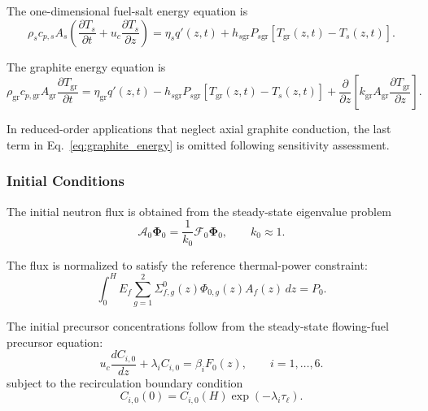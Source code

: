 \documentclass[a4paper,12pt]{article}
\begin{document}
The one-dimensional fuel-salt energy equation is
\begin{equation}
\rho_s c_{p,s}A_s
\left(
\frac{\partial T_s}{\partial t}
+
u_c\frac{\partial T_s}{\partial z}
\right)
=
\eta_s q'(z,t)
+
h_{s\mathrm{gr}}P_{s\mathrm{gr}}
\left[
T_{\mathrm{gr}}(z,t)-T_s(z,t)
\right].
\label{eq:salt_energy}
\end{equation}

The graphite energy equation is
\begin{equation}
\rho_{\mathrm{gr}} c_{p,\mathrm{gr}}A_{\mathrm{gr}}
\frac{\partial T_{\mathrm{gr}}}{\partial t}
=
\eta_{\mathrm{gr}}q'(z,t)
-
h_{s\mathrm{gr}}P_{s\mathrm{gr}}
\left[
T_{\mathrm{gr}}(z,t)-T_s(z,t)
\right]
+
\frac{\partial}{\partial z}
\left[
k_{\mathrm{gr}}A_{\mathrm{gr}}
\frac{\partial T_{\mathrm{gr}}}{\partial z}
\right].
\label{eq:graphite_energy}
\end{equation}

In reduced-order applications that neglect axial graphite conduction, the
last term in Eq.~\eqref{eq:graphite_energy} is omitted following
sensitivity assessment.

\subsubsection{Initial Conditions}

The initial neutron flux is obtained from the steady-state eigenvalue
problem
\begin{equation}
\mathcal{A}_0\boldsymbol{\Phi}_0
=
\frac{1}{k_0}
\mathcal{F}_0\boldsymbol{\Phi}_0,
\qquad
k_0\approx 1.
\label{eq:initial_eigenproblem}
\end{equation}

The flux is normalized to satisfy the reference thermal-power constraint:
\begin{equation}
\int_{0}^{H}
E_f
\sum_{g=1}^{2}
\Sigma_{f,g}^{0}(z)\Phi_{0,g}(z)
A_f(z)\,dz
=
P_0.
\label{eq:power_normalization}
\end{equation}

The initial precursor concentrations follow from the steady-state
flowing-fuel precursor equation:
\begin{equation}
u_c
\frac{dC_{i,0}}{dz}
+
\lambda_i C_{i,0}
=
\beta_i F_0(z),
\qquad
i=1,\ldots,6.
\label{eq:initial_precursor}
\end{equation}
subject to the recirculation boundary condition
\begin{equation}
C_{i,0}(0)
=
C_{i,0}(H)
\exp(-\lambda_i\tau_\ell).
\label{eq:initial_precursor_bc}
\end{equation}
\end{document}
